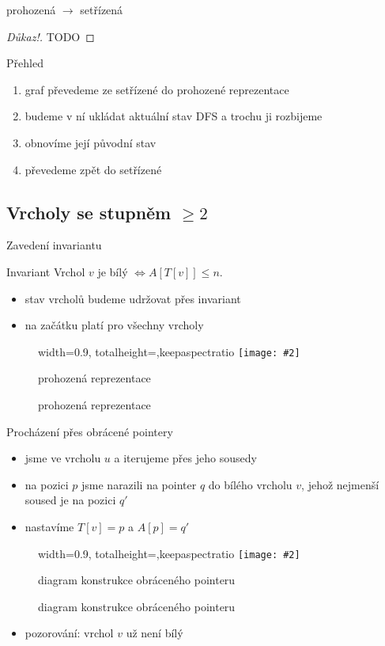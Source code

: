 \documentclass[czech]{beamer}
\makeatletter
\newcommand{\fitimage}[2][\@nil]{
	\begin{figure}
		\begin{adjustbox}{width=0.9\textwidth, totalheight=\textheight-2\baselineskip-2\baselineskip,keepaspectratio}
			\texttt{[image: \#2]}
		\end{adjustbox}
		\def\tmp{#1}%
	 \ifx\tmp\@nnil
			\else
			\caption{#1}
		\fi
	\end{figure}
}
\makeatother
\begin{document}
	\begin{frame}{prohozená $\rightarrow$ setřízená}
		\begin{proof}[Důkaz!]
			TODO
		\end{proof}
	\end{frame}

	\begin{frame}{Přehled}
		\begin{enumerate}
			\item graf převedeme ze setřízené do prohozené reprezentace
			\item budeme v ní ukládat aktuální stav DFS a trochu ji rozbijeme
			\item obnovíme její původní stav
			\item převedeme zpět do setřízené
		\end{enumerate}
	\end{frame}

	\subsection{Vrcholy se stupněm $\ge 2$}

	\begin{frame}{Zavedení invariantu}
		\begin{block}{Invariant}
			Vrchol $v$ je bílý $\iff A[T[v]] \le n$.
		\end{block}
		\begin{itemize}
			\item stav vrcholů budeme udržovat přes invariant
			\item na začátku platí pro všechny vrcholy
		\end{itemize}
		\vfill
		\fitimage[prohozená reprezentace]{images/swapped.png}
	\end{frame}

	\begin{frame}{Procházení přes obrácené pointery}
		\begin{itemize}
			\item jsme ve vrcholu $u$ a iterujeme přes jeho sousedy
			\item na pozici $p$ jsme narazili na pointer $q$ do bílého vrcholu $v$, jehož nejmenší soused je na pozici $q'$
			\item nastavíme $T[v] = p$ a $A[p] = q'$
		\end{itemize}
		\fitimage[diagram konstrukce obráceného pointeru]{images/deg2.png}
		\begin{itemize}
			\item pozorování: vrchol $v$ už není bílý
		\end{itemize}
	\end{frame}
\end{document}
